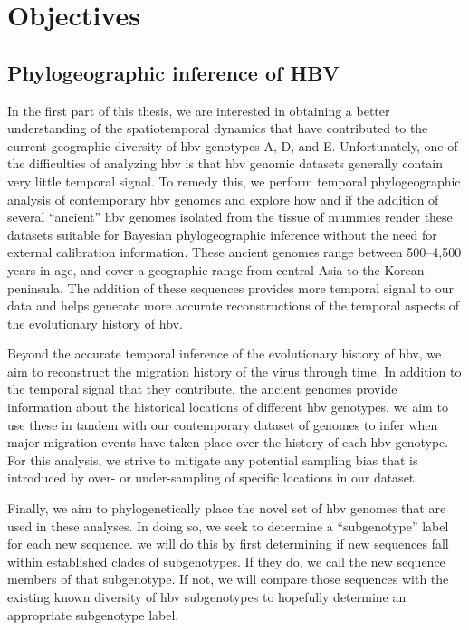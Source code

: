 \chapter{Objectives}
\label{ch:objectives}

\section{Phylogeographic inference of HBV}

In the first part of this thesis, we are interested in obtaining a better understanding of the spatiotemporal dynamics that have contributed to the current geographic diversity of \gls{hbv} genotypes A, D, and E.
Unfortunately, one of the difficulties of analyzing \gls{hbv} is that \gls{hbv} genomic datasets generally contain very little temporal signal.
To remedy this, we perform temporal phylogeographic analysis of contemporary \gls{hbv} genomes and explore how and if the addition of several ``ancient'' \gls{hbv} genomes isolated from the tissue of mummies \cite{muhlemann2018ancient, ross2018paradox} render these datasets suitable for Bayesian phylogeographic inference without the need for external calibration information.
These ancient genomes range between 500--4,500 years in age, and cover a geographic range from central Asia to the Korean peninsula.
The addition of these sequences provides more temporal signal to our data and helps generate more accurate reconstructions of the temporal aspects of the evolutionary history of \gls{hbv}.

Beyond the accurate temporal inference of the evolutionary history of \gls{hbv}, we aim to reconstruct the migration history of the virus through time.
In addition to the temporal signal that they contribute, the ancient genomes provide information about the historical locations of different \gls{hbv} genotypes.
we aim to use these in tandem with our contemporary dataset of genomes to infer when major migration events have taken place over the history of each \gls{hbv} genotype.
For this analysis, we strive to mitigate any potential sampling bias that is introduced by over- or under-sampling of specific locations in our dataset.

Finally, we aim to phylogenetically place the novel set of \gls{hbv} genomes that are used in these analyses.
In doing so, we seek to determine a ``subgenotype'' label for each new sequence.
we will do this by first determining if new sequences fall within established clades of subgenotypes.
If they do, we call the new sequence  members of that subgenotype.
If not, we will compare those sequences with the existing known diversity of \gls{hbv} subgenotypes to hopefully determine an appropriate subgenotype label.

